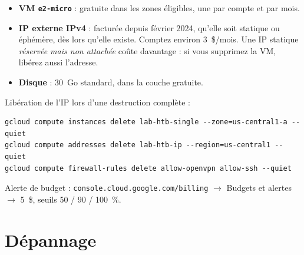 \documentclass[a4paper,12pt]{article}
\begin{document}
\begin{itemize}
    \item \textbf{VM \texttt{e2-micro}} : gratuite dans les zones éligibles, une par compte et par mois.
    \item \textbf{IP externe IPv4} : facturée depuis février 2024, qu'elle soit
          statique ou éphémère, dès lors qu'elle existe. Comptez environ
          3~\$/mois. Une IP statique \emph{réservée mais non attachée} coûte
          davantage : si vous supprimez la VM, libérez aussi l'adresse.
    \item \textbf{Disque} : 30~Go standard, dans la couche gratuite.
\end{itemize}

Libération de l'IP lors d'une destruction complète :

\begin{lstlisting}[style=wincmd]
gcloud compute instances delete lab-htb-single --zone=us-central1-a --quiet
gcloud compute addresses delete lab-htb-ip --region=us-central1 --quiet
gcloud compute firewall-rules delete allow-openvpn allow-ssh --quiet
\end{lstlisting}

Alerte de budget : \texttt{console.cloud.google.com/billing} $\rightarrow$
Budgets et alertes $\rightarrow$ 5~\$, seuils 50 / 90 / 100~\%.

\section{Dépannage}
\label{sec:depannage}
\end{document}
